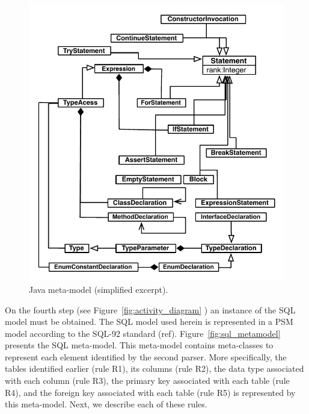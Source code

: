 \documentclass[a4paper,twoside]{article}
\newcommand*\circled[1]{\tikz[baseline=(char.base)]{
  \node[shape=circle,draw, inner sep=0.1pt] (char) {#1};}
}
\begin{document}
\begin{figure}[!h]
\centering
  \includegraphics[scale=0.74]{figuras/JavaMOdelNovo}
\caption{Java meta-model (simplified excerpt).}
\label{fig:java_metamodel}
\end{figure}

On the fourth step (see Figure~\ref{fig:activity_diagram} \circled{\textbf{D}}) an instance of the SQL model must be obtained. The SQL model used herein is represented in a PSM model according to the SQL-92 standard (ref). Figure~\ref{fig:sql_metamodel} presents the SQL meta-model. This meta-model contains meta-classes to represent each element identified by the second parser. More specifically, the tables identified earlier (rule R1), its columns (rule R2), the data type associated with each column (rule R3), the primary key associated with each table (rule R4), and the foreign key associated with each table (rule R5) is represented by this meta-model. Next, we describe each of these rules.
\end{document}
